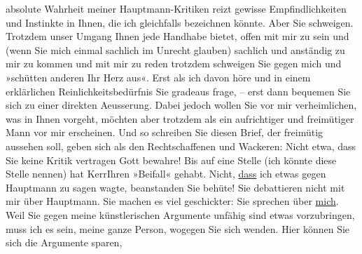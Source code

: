 \begin{ledgroupsized}[t]{13cm}
               absolute Wahrheit meiner Hauptmann-Kritiken reizt gewisse
               Empfindlichkeiten und Instinkte in Ihnen, die ich gleichfalls bezeichnen könnte.\pend
           \pstart
           Aber Sie schweigen. Trotzdem unser Umgang Ihnen jede Handhabe bietet, offen mit mir
               zu sein und (wenn Sie mich einmal sachlich im Unrecht glauben) sachlich und anständig
               zu mir zu kommen und mit mir zu reden{\dotstwo} trotzdem schweigen
               Sie gegen mich und »schütten anderen Ihr Herz aus«. Erst als ich davon höre und in
               einem erklärlichen Reinlichkeitsbedürfnis Sie gradeaus frage, – erst dann bequemen
               Sie sich zu einer direkten Aeusserung. Dabei jedoch wollen Sie vor mir verheimlichen,
               was in Ihnen vorgeht, möchten aber trotzdem als ein aufrichtiger und freimütiger Mann
               vor mir erscheinen.\pend
           \pstart
           Und so schreiben Sie diesen Brief, der freimütig aussehen soll, geben sich als den
               Rechtschaffenen und Wackeren: Nicht etwa, dass Sie keine Kritik vertragen {\dotstwo} Gott bewahre! Bis auf eine Stelle (ich könnte diese
               Stelle nennen) hat KerrIhren »Beifall« gehabt. Nicht,
                  \uline{dass} ich etwas gegen Hauptmann zu sagen wagte, beanstanden Sie {\dotstwo} behüte! Sie debattieren nicht mit mir über Hauptmann. Sie machen es viel geschickter: Sie
               sprechen über \uline{mich}. Weil Sie gegen meine
               künstlerischen Argumente unfähig sind etwas vorzubringen, muss ich es sein, meine
               ganze Person, wogegen Sie sich wenden. Hier können Sie sich die Argumente sparen,

\end{ledgroupsized}

